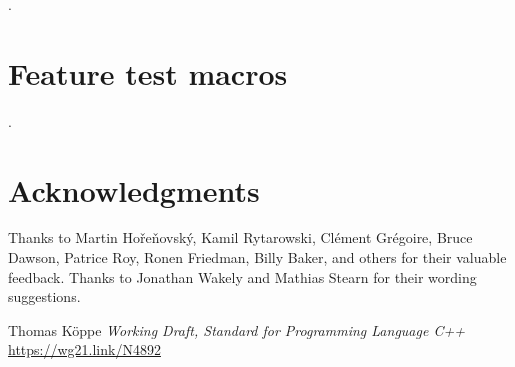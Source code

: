 \documentclass{wg21}
\begin{document}
.

\section{Feature test macros}

.


\section{Acknowledgments}

Thanks to Martin Hořeňovský, Kamil Rytarowski, Clément Grégoire, Bruce Dawson, Patrice Roy, Ronen Friedman, Billy Baker, and others for their valuable feedback.
Thanks to
Jonathan Wakely and Mathias Stearn for their wording suggestions.






\renewcommand{\section}[2]{}%
\begin{thebibliography}{9}

    Thomas Köppe
    \emph{Working Draft, Standard for Programming Language C++}\newline
    \url{https://wg21.link/N4892}

\end{thebibliography}
\end{document}
